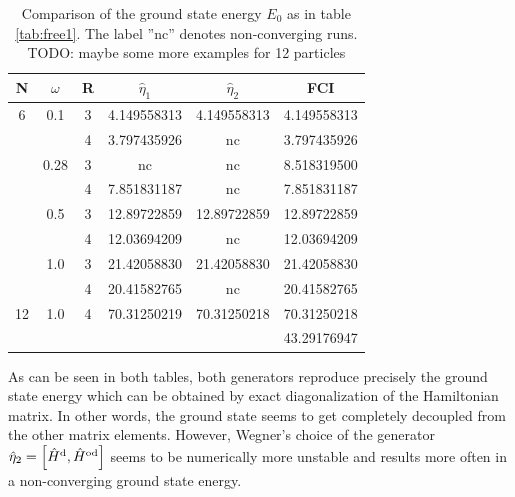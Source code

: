 \begin{table}
\begin{center}
\begin{tabular}{|c|c|c|c|c|c|}
\hline\hline
N&$\omega$ &R & $\hat{\eta}_1$ & $\hat{\eta}_2$ & FCI \\
\hline
6 &  0.1    & 3 & 4.149558313  & 4.149558313  & 4.149558313  \\
 &         & 4 & 3.797435926  &    nc          & 3.797435926  \\ 
 \cline{2-6}    
 &  0.28   & 3 &   nc   &  nc &  8.518319500  \\
 &         & 4 &  7.851831187  & nc  &   7.851831187   \\
  \cline{2-6}
 &  0.5   & 3 &   12.89722859    & 12.89722859   &  12.89722859         \\
&         & 4 &  12.03694209  & nc &     12.03694209   \\
 \cline{2-6} 
 &  1.0    & 3 & 21.42058830    & 21.42058830  &  21.42058830     \\  
 &         & 4 & 20.41582765   &  nc  &   20.41582765   \\
\hline
12 & 1.0 & 4 & 70.31250219 &70.31250218 & 70.31250218 \\
\cline{2-6} 
  & & & & & 43.29176947 \\
 \hline\hline
 \end{tabular}
\end{center}
\caption{Comparison of the ground state energy $E_0$ as in table \ref{tab:free1}. The label ''nc'' denotes non-converging runs. TODO: maybe some more examples for 12 particles}
\label{tab:free2}
\end{table}

As can be seen in both tables, both generators reproduce precisely the ground state energy which can be obtained by exact diagonalization of the Hamiltonian matrix. In other words, the ground state seems to get completely  decoupled from the other matrix elements. However, Wegner's choice of the generator $\hat{\eta}_2 = \left[ \hat{H}^{\rm d}, \hat{H}^{\rm od} \right]$ seems to be numerically more unstable and results more often in a non-converging ground state energy. 

